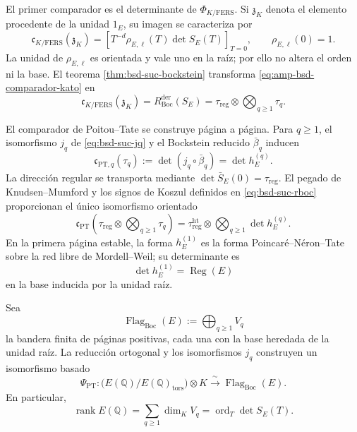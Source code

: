 El primer comparador es el determinante de
\(\Phi_{K/\mathrm{FERS}}\). Si \(\mathfrak z_K\) denota el elemento
procedente de la unidad \(1_E\), su imagen se caracteriza por
\begin{equation}\label{eq:amp-bsd-comparador-kato}
 \mathfrak c_{K/\mathrm{FERS}}(\mathfrak z_K)
 =\left[T^{-d}\rho_{E,\ell}(T)\det S_E(T)\right]_{T=0},
 \qquad
 \rho_{E,\ell}(0)=1.
\end{equation}
La unidad de \(\rho_{E,\ell}\) es orientada y vale uno en la raíz; por ello no
altera el orden ni la base. El teorema
\ref{thm:bsd-suc-bockstein} transforma \eqref{eq:amp-bsd-comparador-kato} en
\begin{equation}\label{eq:amp-bsd-kato-bockstein}
 \mathfrak c_{K/\mathrm{FERS}}(\mathfrak z_K)
 =R_{\mathrm{Boc}}^{\mathrm{der}}(S_E)
 =\tau_{\mathrm{reg}}\otimes\bigotimes_{q\geq1}\tau_q.
\end{equation}

El comparador de Poitou--Tate se construye página a página. Para
\(q\geq1\), el isomorfismo \(j_q\) de
\eqref{eq:bsd-suc-jq} y el Bockstein reducido
\(\bar\beta_q\) inducen
\begin{equation}\label{eq:amp-bsd-comparador-pt-q}
 \mathfrak c_{\mathrm{PT},q}(\tau_q)
 :=\det\!\left(j_q\circ\bar\beta_q\right)
 =\det h_E^{(q)}.
\end{equation}
La dirección regular se transporta mediante
\(\det\bar S_E(0)=\tau_{\mathrm{reg}}\). El pegado de Knudsen--Mumford y los
signos de Koszul definidos en \eqref{eq:bsd-suc-rboc} proporcionan el único
isomorfismo orientado
\begin{equation}\label{eq:amp-bsd-comparador-pt}
 \mathfrak c_{\mathrm{PT}}
 \left(\tau_{\mathrm{reg}}\otimes\bigotimes_{q\geq1}\tau_q\right)
 =\tau_{\mathrm{reg}}^{\mathrm{ht}}
  \otimes\bigotimes_{q\geq1}\det h_E^{(q)}.
\end{equation}
En la primera página estable, la forma \(h_E^{(1)}\) es la forma
Poincaré--Néron--Tate sobre la red libre de Mordell--Weil; su determinante es
\begin{equation}\label{eq:amp-bsd-regulador-nt}
 \det h_E^{(1)}=\operatorname{Reg}(E)
\end{equation}
en la base inducida por la unidad raíz.

\begin{lemma}
\label{lem:amp-bsd-grado-pt}
Sea
\[
 \operatorname{Flag}_{\mathrm{Boc}}(E)
 :=\bigoplus_{q\geq1}V_q
\]
la bandera finita de páginas positivas, cada una con la base heredada de la
unidad raíz. La reducción ortogonal y los isomorfismos \(j_q\) construyen un
isomorfismo basado
\begin{equation}\label{eq:amp-bsd-psi-pt}
 \Psi_{\mathrm{PT}}:
 \bigl(E(\mathbb Q)/E(\mathbb Q)_{\mathrm{tors}}\bigr)\otimes K
 \xrightarrow{\ \sim\ }\operatorname{Flag}_{\mathrm{Boc}}(E).
\end{equation}
En particular,
\begin{equation}\label{eq:amp-bsd-rango-bandera}
 \operatorname{rank}E(\mathbb Q)
 =\sum_{q\geq1}\dim_KV_q
 =\operatorname{ord}_T\det S_E(T).
\end{equation}
\end{lemma}

